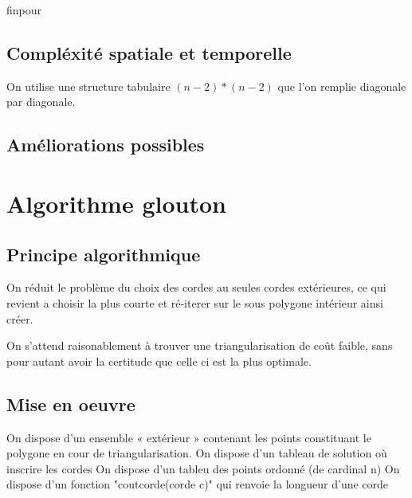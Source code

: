 \documentclass[a4paper,10pt]{article}
\begin{document}
\begin{tabbing}
  
finpour\\
\end{tabbing}
 
\subsection{Compléxité spatiale et temporelle}
On utilise une structure tabulaire \((n-2)*(n-2)\) que l'on remplie diagonale par diagonale.

\subsection{Améliorations possibles}

\section{Algorithme glouton}


\subsection{Principe algorithmique}

On réduit le problème du choix des cordes au seules cordes extérieures, ce qui revient a choisir la plus courte et ré-iterer sur le sous polygone intérieur ainsi créer.

On s'attend raisonablement à trouver une triangularisation de coût faible, sans pour autant avoir la certitude que celle ci est la plus optimale.

\subsection{Mise en oeuvre}
 

On dispose d'un ensemble « extérieur » contenant les points constituant le polygone en cour de triangularisation.
On dispose d'un tableau de solution où inscrire les cordes
On dispose d'un tableu des points ordonné (de cardinal n)
On dispose d'un fonction "coutcorde(corde c)" qui renvoie la longueur d'une corde
 
 
 
\end{document}
